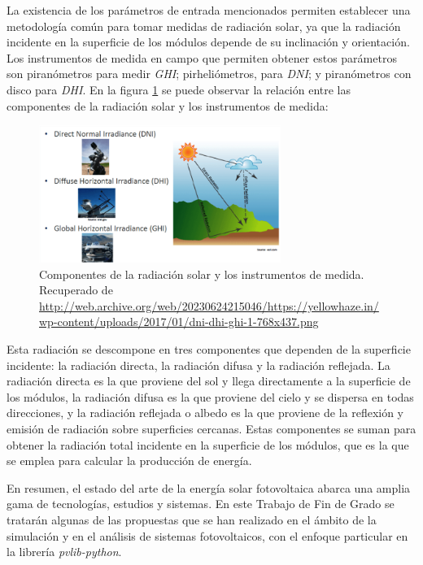 La existencia de los parámetros de entrada mencionados permiten establecer una metodología común para tomar medidas de radiación solar, ya que la radiación incidente en la superficie de los módulos depende de su inclinación y orientación. Los instrumentos de medida en campo que permiten obtener estos parámetros son piranómetros para medir \textit{GHI}; pirheliómetros, para \textit{DNI}; y piranómetros con disco para \textit{DHI}. En la figura \ref{fig:irrad_componentes} se puede observar la relación entre las componentes de la radiación solar y los instrumentos de medida:

\begin{figure}[H]
      \centering
      \includegraphics[width=0.7\textwidth]{./images/SoA_irrad/dni-dhi-ghi-1-768x437.png}
      \caption{Componentes de la radiación solar y los instrumentos de medida. Recuperado de \url{http://web.archive.org/web/20230624215046/https://yellowhaze.in/wp-content/uploads/2017/01/dni-dhi-ghi-1-768x437.png}}
      \label{fig:irrad_componentes}
\end{figure}

Esta radiación se descompone en tres componentes que dependen de la superficie incidente: la radiación directa, la radiación difusa y la radiación reflejada. La radiación directa es la que proviene del sol y llega directamente a la superficie de los módulos, la radiación difusa es la que proviene del cielo y se dispersa en todas direcciones, y la radiación reflejada o albedo es la que proviene de la reflexión y emisión de radiación sobre superficies cercanas. Estas componentes se suman para obtener la radiación total incidente en la superficie de los módulos, que es la que se emplea para calcular la producción de energía.

En resumen, el estado del arte de la energía solar fotovoltaica abarca una amplia gama de tecnologías, estudios y sistemas. En este Trabajo de Fin de Grado se tratarán algunas de las propuestas que se han realizado en el ámbito de la simulación y en el análisis de sistemas fotovoltaicos, con el enfoque particular en la librería \textit{pvlib-python}.

